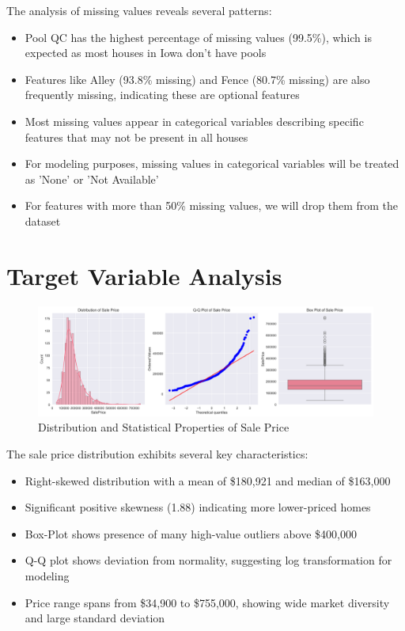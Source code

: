 The analysis of missing values reveals several patterns:
\begin{itemize}
    \item Pool QC has the highest percentage of missing values (99.5\%), which is expected as most houses in Iowa don't have pools
    \item Features like Alley (93.8\% missing) and Fence (80.7\% missing) are also frequently missing, indicating these are optional features
    \item Most missing values appear in categorical variables describing specific features that may not be present in all houses
    \item For modeling purposes, missing values in categorical variables will be treated as 'None' or 'Not Available'
    \item For features with more than 50\% missing values, we will drop them from the dataset   
\end{itemize}

\section{Target Variable Analysis}
\begin{figure}[H]
    \centering
    \includegraphics[width=1.0\textwidth]{figures/sale_price_distribution.png}
    \caption{Distribution and Statistical Properties of Sale Price}
    \label{fig:sale_price_dist}
\end{figure}

The sale price distribution exhibits several key characteristics:
\begin{itemize}
    \item Right-skewed distribution with a mean of \$180,921 and median of \$163,000
    \item Significant positive skewness (1.88) indicating more lower-priced homes
    \item Box-Plot shows presence of many high-value outliers above \$400,000
    \item Q-Q plot shows deviation from normality, suggesting log transformation for modeling
    \item Price range spans from \$34,900 to \$755,000, showing wide market diversity and large standard deviation
\end{itemize}

